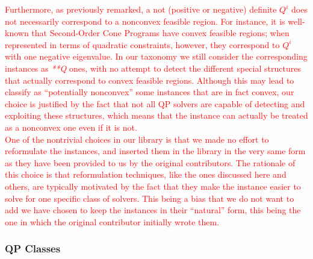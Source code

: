 \textcolor{red}{
Furthermore, as previously remarked, a not (positive or negative) definite $Q^i$ does not necessarily correspond to a nonconvex feasible region. For instance, it is well-known that Second-Order Cone Programs have convex feasible regions; when represented in terms of quadratic constraints, however, they correspond to $Q^i$ with one negative eigenvalue. In our taxonomy we still consider the corresponding instances as \textit{**Q} ones, with no attempt to detect the different special structures that actually correspond to convex feasible regions. Although this may lead to classify as ``potentially nonconvex'' some instances that are in fact convex, our choice is justified by the fact that not all QP solvers are capable of detecting and exploiting these structures, which means that the instance can actually be treated as a nonconvex one even if it is not.\\
}
\textcolor{red}{
One of the nontrivial choices in our library is that we made no effort to reformulate the instances, and inserted them in the library in the very same form as they have been provided to us by the original contributors. The rationale of this choice is that reformulation techniques, like the ones discussed here and others, are typically motivated by the fact that they make the instance easier to solve for one specific class of solvers. This being a bias that we do not want to add we have chosen to keep the instances in their ``natural'' form, this being the one in which the original contributor initially wrote them.
}


\subsubsection{QP Classes}\label{ssec:classes}

